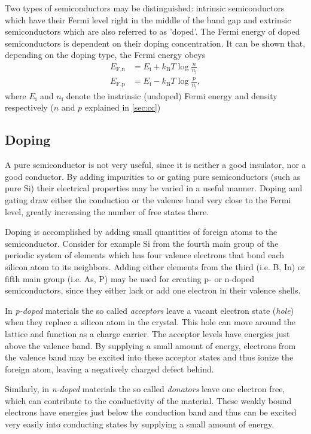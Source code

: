 Two types of semiconductors may be distinguished: intrinsic semiconductors which have their Fermi level right in the middle of the band gap and extrinsic semiconductors which are also referred to as 'doped'. The Fermi energy of doped semiconductors is dependent on their doping concentration. It can be shown that, depending on the doping type, the Fermi energy obeys
\begin{align*}
	E_\text{F,n} &= E_\text{i} + k_\text{B}T\log\frac{n}{n_\text{i}} \\
	E_\text{F,p} &= E_\text{i} - k_\text{B}T\log\frac{p}{n_\text{i}},
\end{align*}
where $E_\text{i}$ and $n_\text{i}$ denote the instrinsic (undoped) Fermi energy and density respectively ($n$ and $p$ explained in \autoref{sec:cc})

\subsection{Doping}
A pure semiconductor is not very useful, since it is neither a good insulator, nor a good conductor.
By adding impurities to or gating pure semiconductors (such as pure Si) their electrical properties may be varied in a useful manner.
Doping and gating draw either the conduction or the valence band very close to the Fermi level, greatly increasing the number of free states there.

Doping is accomplished by adding small quantities of foreign atoms to the semiconductor.
Consider for example Si from the fourth main group of the periodic system of elements which has four valence electrons that bond each silicon atom to its neighbors.
Adding either elements from the third (i.e. B, In) or fifth main group (i.e. As, P) may be used for creating p- or n-doped semiconductors, since they either lack or add one electron in their valence shells.

In \textit{p-doped} materials the so called \textit{acceptors} leave a vacant electron state (\textit{hole}) when they replace a silicon atom in the crystal.
This hole can move around the lattice and function as a charge carrier.
The acceptor levels have energies just above the valence band.
By supplying a small amount of energy, electrons from the valence band may be excited into these acceptor states and thus ionize the foreign atom, leaving a negatively charged defect behind.

Similarly, in \textit{n-doped} materials the so called \textit{donators} leave one electron free, which can contribute to the conductivity of the material.
These weakly bound electrons have energies just below the conduction band and thus can be excited very easily into conducting states by supplying a small amount of energy.


